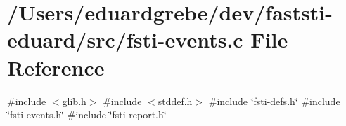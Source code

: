 \hypertarget{fsti-events_8c}{}\section{/\+Users/eduardgrebe/dev/faststi-\/eduard/src/fsti-\/events.c File Reference}
\label{fsti-events_8c}
{\ttfamily \#include $<$glib.\+h$>$}\newline
{\ttfamily \#include $<$stddef.\+h$>$}\newline
{\ttfamily \#include \char`\"{}fsti-\/defs.\+h\char`\"{}}\newline
{\ttfamily \#include \char`\"{}fsti-\/events.\+h\char`\"{}}\newline
{\ttfamily \#include \char`\"{}fsti-\/report.\+h\char`\"{}}\newline
